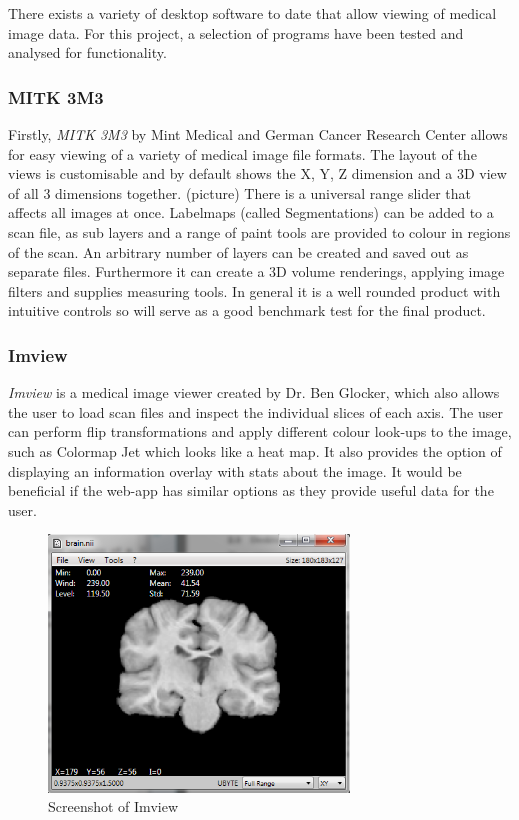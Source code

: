 \documentclass[a4paper,11pt,titlepage]{article}
\begin{document}
There exists a variety of desktop software to date that allow viewing of medical image data. For this project, a selection of programs have been tested and analysed for functionality.

\subsubsection{MITK 3M3}
     Firstly, \textit{MITK 3M3} by Mint Medical and German Cancer Research Center allows for easy viewing of a variety of medical image file formats. The layout of the views is customisable and by default shows the X, Y, Z dimension and a 3D view of all 3 dimensions together. (picture) There is a universal range slider that affects all images at once. Labelmaps (called Segmentations) can be added to a scan file, as sub layers and a range of paint tools are provided to colour in regions of the scan. An arbitrary number of layers can be created and saved out as separate files. 
     Furthermore it can create a 3D volume renderings, applying image filters and supplies measuring tools. In general it is a well rounded product with intuitive controls so will serve as a good benchmark test for the final product.

\subsubsection{Imview}
\textit{Imview} is a medical image viewer created by Dr. Ben Glocker, which also allows the user to load scan files and inspect the individual slices of each axis. The user can perform flip transformations and apply different colour look-ups to the image, such as Colormap Jet which looks like a heat map. It also provides the option of displaying an information overlay with stats about the image. It would be beneficial if the web-app has similar options as they provide useful data for the user.

\begin{figure}[ht!]
\centering
\includegraphics[width=80mm]{graphics/imview_01.png}
\caption{Screenshot of Imview}
\label{fig:UIdesign1}
\end{figure}
\end{document}
